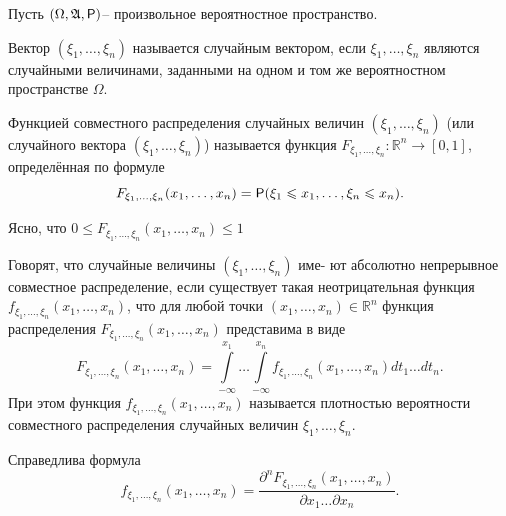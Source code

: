 
Пусть $(\Omega,\mathfrak{A},\P)$-- произвольное вероятностное пространство.

\begin{definition}
\label{def:15.1}
	Вектор $(\xi_1, \dots, \xi_n)$ называется случайным вектором, если $\xi_1, \dots, \xi_n$ являются случайными величинами, заданными на одном
и том же вероятностном пространстве $\Omega$.
\end{definition}

\begin{definition}
\label{def:15.2}
	Функцией совместного распределения случайных
величин $(\xi_1, \dots, \xi_n)$ (или случайного вектора $(\xi_1, \dots, \xi_n)$) называется функция $F_{\xi_1, \dots, \xi_n} : \mathbb{R}^n \rightarrow [0, 1]$, определённая по формуле
\begin{equation*}
	F_{\xi_1, \dots, \xi_n}(x_1,\dots,x_n)=\P(\xi_1\leqslant x_1,\dots,\xi_n\leqslant x_n).
\end{equation*}

Ясно, что $0 \leqslant F_{\xi_1, \dots, \xi_n}(x_1,\dots,x_n) \leqslant 1$

\end{definition}

\begin{definition}
\label{def:15.3}
	Говорят, что случайные величины $(\xi_1, \dots, \xi_n)$ име-
ют абсолютно непрерывное совместное распределение, если существует
такая неотрицательная функция $f_{\xi_1, \dots, \xi_n}(x_1,\dots,x_n)$, что для любой точки
$(x_1,\dots,x_n)\in\mathbb{R}^n$ функция распределения $F_{\xi_1, \dots, \xi_n}(x_1,\dots,x_n)$ представима в
виде
\begin{equation*}
	F_{\xi_1, \dots, \xi_n}(x_1,\dots,x_n)=\int\limits_{-\infty}^{x_1}\ldots
	\int\limits_{-\infty}^{x_n}f_{\xi_1, \dots, \xi_n}(x_1,\dots,x_n)dt_1\ldots dt_n.
\end{equation*}
При этом функция $f_{\xi_1, \dots, \xi_n}(x_1,\dots,x_n)$ называется плотностью вероятности совместного распределения случайных величин ${\xi_1, \dots, \xi_n}$.
\end{definition}

\begin{lemma}
\label{lemma:15.4}
Справедлива формула
	\begin{equation*}
		f_{\xi_1, \dots, \xi_n}(x_1,\dots,x_n)=\frac
		{\partial^nF_{\xi_1, \dots, \xi_n}(x_1,\dots,x_n)}
		{\partial x_1\ldots \partial x_n}.
	\end{equation*}
\end{lemma}

